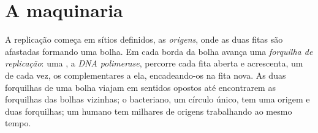 \section{A maquinaria}

\begin{proposition}\label{prop:g11:dna-replication:forks}
A replicação começa em sítios definidos, as \emph{origens}, onde as
duas fitas são afastadas formando uma bolha. Em cada borda da bolha
avança uma \emph{forquilha de replicação}:
uma , a \emph{DNA polimerase}, percorre
cada fita aberta e acrescenta, um de cada vez, os 
complementares a ela, encadeando-os na fita nova. As duas forquilhas de
uma bolha viajam em sentidos opostos até encontrarem as forquilhas das
bolhas vizinhas; o  bacteriano, um círculo único, tem uma
origem e duas forquilhas; um  humano tem milhares de origens
trabalhando ao mesmo tempo.
\end{proposition}
\admitted

